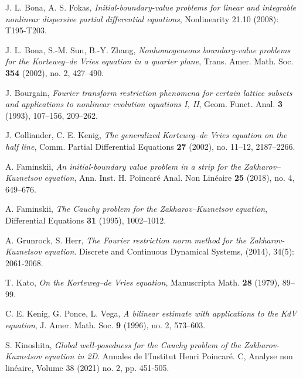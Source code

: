 \documentclass[11pt]{article}
\numberwithin{equation}{section}
\begin{document}
\begin{enumerate}


 J. L. Bona, A. S. Fokas, \textit{Initial-boundary-value problems for linear and integrable nonlinear dispersive partial differential equations}, Nonlinearity 21.10 (2008): T195-T203.

 J. L. Bona, S.-M. Sun, B.-Y. Zhang, \textit{Nonhomogeneous boundary-value problems for the Korteweg--de Vries equation in a quarter plane}, Trans. Amer. Math. Soc. \textbf{354} (2002), no. 2, 427--490.

 J. Bourgain, \textit{Fourier transform restriction phenomena for certain lattice subsets and applications to nonlinear evolution equations I, II}, Geom. Funct. Anal. \textbf{3} (1993), 107--156, 209--262.

 J. Colliander, C. E. Kenig, \textit{The generalized
Korteweg--de Vries equation on the half line}, Comm. Partial
Differential Equations \textbf{27} (2002), no. 11--12, 2187--2266.

 A. Faminskii, \textit{An initial-boundary value problem in a strip for the Zakharov--Kuznetsov equation}, Ann. Inst. H. Poincaré Anal. Non Linéaire \textbf{25} (2018), no. 4, 649--676.


 A. Faminskii, \textit{The Cauchy problem for the Zakharov--Kuznetsov equation}, Differential Equations \textbf{31} (1995), 1002--1012.

 A. Grunrock, S. Herr, \textit{The Fourier restriction norm method for the Zakharov-Kuznetsov equation}. Discrete and Continuous Dynamical Systems, (2014), 34(5): 2061-2068.

 T. Kato, \textit{On the Korteweg--de Vries equation}, Manuscripta Math. \textbf{28} (1979), 89--99.

 C. E. Kenig, G. Ponce, L. Vega, \textit{A bilinear estimate with applications to the KdV equation}, J. Amer. Math. Soc. \textbf{9} (1996), no. 2, 573--603.

 S. Kinoshita, \textit{Global well-posedness for the Cauchy problem of the Zakharov-Kuznetsov equation in 2D}. Annales de l'Institut Henri Poincaré. C, Analyse non linéaire, Volume 38 (2021) no. 2, pp. 451-505.


\end{enumerate}
\end{document}
